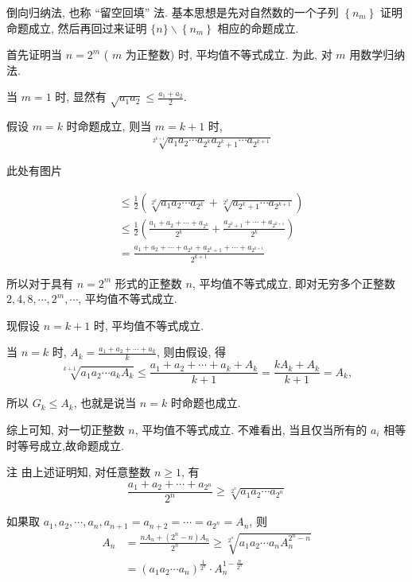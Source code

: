 倒向归纳法, 也称 “留空回填” 法. 基本思想是先对自然数的一个子列 $\left\{n_{m}\right\}$ 证明命题成立, 然后再回过来证明 $\{n\} \backslash\left\{n_{m}\right\}$ 相应的命题成立.

首先证明当 $n=2^{m}$ ( $m$ 为正整数) 时, 平均值不等式成立. 为此, 对 $m$ 用数学归纳法.

当 $m=1$ 时, 显然有 $\sqrt{a_{1} a_{2}} \leqslant \frac{a_{1}+a_{2}}{2}$.

假设 $m=k$ 时命题成立, 则当 $m=k+1$ 时,
$$
\begin{aligned}
& \sqrt[2^{k+1}]{a_{1} a_{2} \cdots a_{2^{k}} a_{2^{k}+1} \cdots a_{2^{k+1}}}
\end{aligned}
$$

\begin{center}
此处有图片 %
\end{center}
$$
\begin{aligned}
& \leqslant \frac{1}{2}\left(\sqrt[2^{k}]{a_{1} a_{2} \cdots a_{2^{k}}}+\sqrt[2^{k}]{a_{2^{k}+1} \cdots a_{2^{k+1}}}\right) \\
& \leqslant \frac{1}{2}\left(\frac{a_{1}+a_{2}+\cdots+a_{2^{k}}}{2^{k}}+\frac{a_{2^{k}+1}+\cdots+a_{2^{k+1}}}{2^{k}}\right) \\
& =\frac{a_{1}+a_{2}+\cdots+a_{2^{k}}+a_{2^{k}+1}+\cdots+a_{2^{k+1}}}{2^{k+1}}
\end{aligned}
$$

所以对于具有 $n=2^{m}$ 形式的正整数 $n$, 平均值不等式成立, 即对无穷多个正整数 $2,4,8, \cdots, 2^{m}, \cdots$, 平均值不等式成立.

现假设 $n=k+1$ 时, 平均值不等式成立.

当 $n=k$ 时, $A_{k}=\frac{a_{1}+a_{2}+\cdots+a_{k}}{k}$, 则由假设, 得
$$
\sqrt[k+1]{a_{1} a_{2} \cdots a_{k} A_{k}} \leqslant \frac{a_{1}+a_{2}+\cdots+a_{k}+A_{k}}{k+1}=\frac{k A_{k}+A_{k}}{k+1}=A_{k},
$$

所以 $G_{k} \leqslant A_{k}$, 也就是说当 $n=k$ 时命题也成立.

综上可知, 对一切正整数 $n$, 平均值不等式成立. 不难看出, 当且仅当所有的 $a_{i}$ 相等时等号成立,故命题成立.

注 由上述证明知, 对任意整数 $n \geqslant 1$, 有
$$
\frac{a_{1}+a_{2}+\cdots+a_{2^{n}}}{2^{n}} \geqslant \sqrt[2^{n}]{a_{1} a_{2} \cdots a_{2^{n}}}
$$

如果取 $a_{1}, a_{2}, \cdots, a_{n}, a_{n+1}=a_{n+2}=\cdots=a_{2^{n}}=A_{n}$, 则
$$
\begin{aligned}
A_{n} & =\frac{n A_{n}+\left(2^{n}-n\right) A_{n}}{2^{n}} \geqslant \sqrt[2^{n}]{a_{1} a_{2} \cdots a_{n} A_{n}^{2^{n}-n}} \\
& =\left(a_{1} a_{2} \cdots a_{n}\right)^{\frac{1}{2^{n}}} \cdot A_{n}^{1-\frac{n}{2^{n}}}
\end{aligned}
$$

